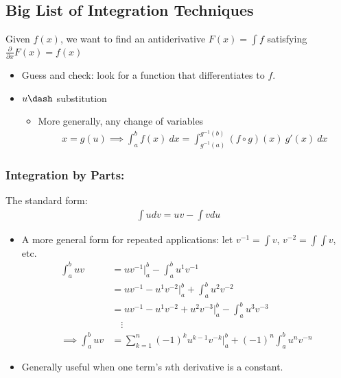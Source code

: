 \hypertarget{big-list-of-integration-techniques}{%
\subsection{Big List of Integration
Techniques}\label{big-list-of-integration-techniques}}

Given \(f(x)\), we want to find an antiderivative \(F(x) = \int f\)
satisfying \(\frac{\partial}{\partial x}F(x) = f(x)\)

\begin{itemize}
\tightlist
\item
  Guess and check: look for a function that differentiates to \(f\).
\item
  \(u\dash\) substitution

  \begin{itemize}
  \tightlist
  \item
    More generally, any change of variables
    \begin{align*}
    x = g(u) \implies \int_a^b f(x)~dx = \int_{g^{-1}(a)}^{g^{-1}(b)} (f\circ g)(x) ~g'(x)~dx
    \end{align*}
  \end{itemize}
\end{itemize}

\hypertarget{integration-by-parts}{%
\subsubsection{Integration by Parts:}\label{integration-by-parts}}

The standard form:
\begin{align*}
\int u dv = uv - \int v du
\end{align*}

\begin{itemize}
\tightlist
\item
  A more general form for repeated applications: let
  \(v^{-1} = \int v\), \(v^{-2} = \int\int v\), etc.
  \begin{align*}
  \int_a^b uv &= uv^{-1}\bigg\rvert_a^b  - \int_a^b u^{1} v^{-1}\\
  &= uv^{-1} - u^1v^{-2}\bigg\rvert_a^b + \int_a^b u^2v^{-2} \\
  &= uv^{-1} - u^1v^{-2} + u^2v^{-3}\bigg\rvert_a^b - \int_a^b u^3v^{-3} \\
  &\quad\vdots \\
  \implies \int_a^b uv &= \sum_{k=1}^n (-1)^k u^{k-1}v^{-k} \bigg\rvert_a^b + (-1)^n\int_a^b u^nv^{-n} 
  \end{align*}
\item
  Generally useful when one term's \(n\)th derivative is a constant.
\end{itemize}

